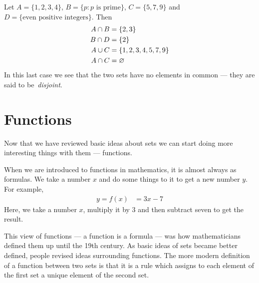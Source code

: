 \begin{eg}
Let $A = \{1,2,3,4 \}$, $B = \{p : p \mbox{ is prime} \}$,
$C = \{5,7,9\}$ and $D = \{\mbox{even positive integers}\}$. Then
\begin{align*}
  A \cap B &= \{2,3\} \\
  B \cap D &= \{2 \} \\
  A \cup C &= \{1,2,3,4,5,7,9\} \\
  A \cap C &= {\varnothing}
\end{align*}
In this last case we see that the two sets have no elements in common --- they
are said to be~\emph{disjoint}.
\end{eg}

\section{Functions}
Now that we have reviewed basic ideas about sets we can start doing more
interesting things with them --- functions.

When we are introduced to functions in mathematics, it is almost always as
formulas. We take a number $x$ and do some things to it to get a new number
$y$. For example,
\begin{align*}
  y = f(x) &= 3x-7
\end{align*}
Here, we take a number $x$, multiply it by 3 and then subtract seven to get the
result.

This view of functions --- a function is a formula --- was how mathematicians
defined them up until the 19th century. As basic ideas of sets became better
defined, people revised ideas surrounding functions. The more modern definition of a
function between two sets is that it is a rule which assigns to each element of the first
set a unique element of the second set.

